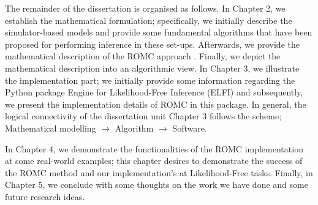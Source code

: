 The remainder of the dissertation is organised as follows. In Chapter 2, we establish the mathematical formulation; specifically, we
initially describe the simulator-based models and provide some
fundamental algorithms that have been proposed for performing
inference in these set-ups. Afterwards, we provide the mathematical
description of the ROMC approach \autocite{Ikonomov2019}. Finally, we depict the mathematical description into an algorithmic view. In Chapter 3, we illustrate the implementation part; we initially provide some
information regarding the Python package Engine for Likelihood-Free
Inference (ELFI) \autocite{1708.00707} and subsequently, we present the
implementation details of ROMC in this package. In general, the logical connectivity of the dissertation unit Chapter 3 follows the scheme; Mathematical modelling $\rightarrow$ Algorithm $\rightarrow$ Software.

In Chapter 4, we demonstrate the functionalities of the ROMC implementation at some
real-world examples; this chapter desires to demonstrate the success of
the ROMC method and our implementation's at Likelihood-Free
tasks. Finally, in Chapter 5, we conclude with some thoughts on the
work we have done and some future research ideas.